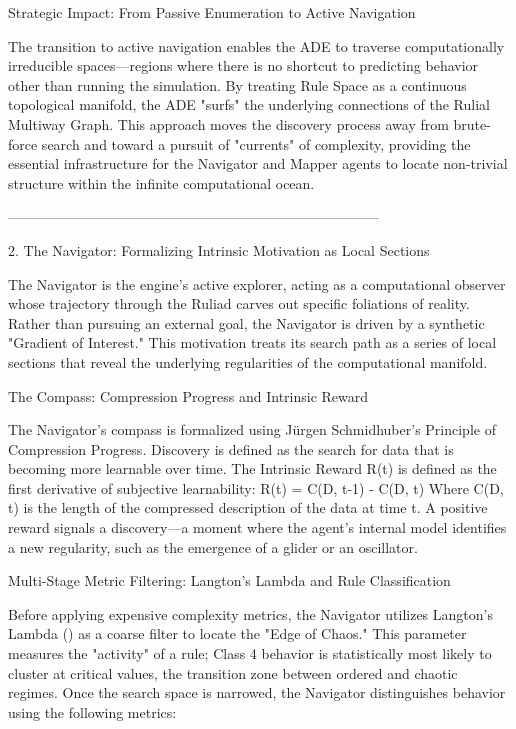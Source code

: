 Strategic Impact: From Passive Enumeration to Active Navigation

The transition to active navigation enables the ADE to traverse computationally irreducible spaces—regions where there is no shortcut to predicting behavior other than running the simulation. By treating Rule Space as a continuous topological manifold, the ADE "surfs" the underlying connections of the Rulial Multiway Graph. This approach moves the discovery process away from brute-force search and toward a pursuit of "currents" of complexity, providing the essential infrastructure for the Navigator and Mapper agents to locate non-trivial structure within the infinite computational ocean.


--------------------------------------------------------------------------------


2. The Navigator: Formalizing Intrinsic Motivation as Local Sections

The Navigator is the engine’s active explorer, acting as a computational observer whose trajectory through the Ruliad carves out specific foliations of reality. Rather than pursuing an external goal, the Navigator is driven by a synthetic "Gradient of Interest." This motivation treats its search path as a series of local sections that reveal the underlying regularities of the computational manifold.

The Compass: Compression Progress and Intrinsic Reward

The Navigator’s compass is formalized using Jürgen Schmidhuber’s Principle of Compression Progress. Discovery is defined as the search for data that is becoming more learnable over time. The Intrinsic Reward R(t) is defined as the first derivative of subjective learnability: R(t) = C(D, t-1) - C(D, t) Where C(D, t) is the length of the compressed description of the data at time t. A positive reward signals a discovery—a moment where the agent’s internal model identifies a new regularity, such as the emergence of a glider or an oscillator.

Multi-Stage Metric Filtering: Langton’s Lambda and Rule Classification

Before applying expensive complexity metrics, the Navigator utilizes Langton’s Lambda (\lambda) as a coarse filter to locate the "Edge of Chaos." This parameter measures the "activity" of a rule; Class 4 behavior is statistically most likely to cluster at critical \lambda values, the transition zone between ordered and chaotic regimes. Once the search space is narrowed, the Navigator distinguishes behavior using the following metrics:

